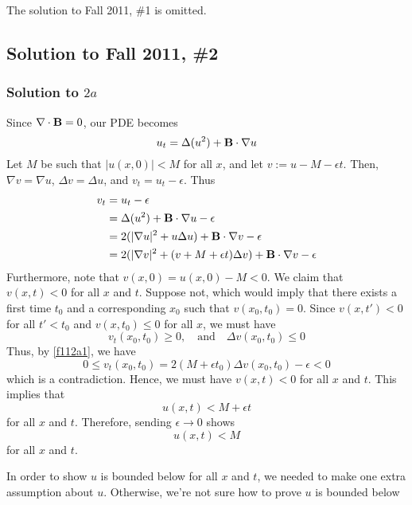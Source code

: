 \noindent The solution to Fall 2011, \#1 is omitted.


\subsection*{Solution to Fall 2011, \#2}
\label{F11Q2}

\subsubsection*{Solution to $2a$}

Since $\nabla \cdot \textbf{B} = 0$, our PDE becomes
$$ u_t = \Delta (u^2) + \textbf{B} \cdot \nabla u $$
Let $M$ be such that $|u(x,0)| < M$ for all $x$, and let $v := u - M - \epsilon t$. Then, $\nabla v = \nabla u$, $\Delta v = \Delta u$, and $v_t = u_t - \epsilon$. Thus
\begin{align}
\notag v_t &= u_t - \epsilon \\
\notag &= \Delta (u^2) + \textbf{B} \cdot \nabla u - \epsilon \\
\notag &= 2(|\nabla u|^2 + u \Delta u) + \textbf{B} \cdot \nabla v - \epsilon \\
\label{f112a1} &= 2(|\nabla v|^2 + (v + M + \epsilon t) \Delta v) + \textbf{B} \cdot \nabla v - \epsilon
\end{align}
Furthermore, note that $v(x,0) = u(x,0) - M < 0$. We claim that $v(x,t) < 0$ for all $x$ and $t$. Suppose not, which would imply that there exists a first time $t_0$ and a corresponding $x_0$ such that $v(x_0,t_0) = 0$. Since $v(x,t') < 0$ for all $t' < t_0$ and $v(x,t_0) \leq 0$ for all $x$, we must have
$$v_t(x_0,t_0) \geq 0, \quad \text{and} \quad \Delta v(x_0,t_0) \leq 0$$
Thus, by \eqref{f112a1}, we have
$$ 0 \leq v_t (x_0,t_0) = 2(M+\epsilon t_0) \Delta v(x_0,t_0) - \epsilon < 0$$
which is a contradiction. Hence, we must have $v(x,t) < 0 $ for all $x$ and $t$. This implies that
$$ u(x,t) < M + \epsilon t $$
for all $x$ and $t$. Therefore, sending $\epsilon \to 0$ shows
$$ u(x,t) < M $$
for all $x$ and $t$.

In order to show $u$ is bounded below for all $x$ and $t$, we needed to make one extra assumption about $u$. Otherwise, we're not sure how to prove $u$ is bounded below

